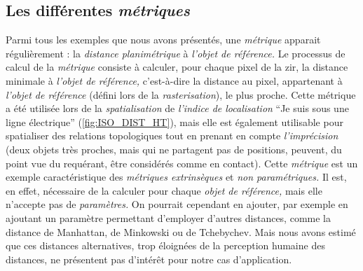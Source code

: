 \subsection{Les différentes \emph{métriques}}

Parmi tous les exemples que nous avons présentés, une \emph{métrique}
apparait régulièrement : la \emph{distance planimétrique} à
\emph{l'objet de référence.} Le processus de calcul de la
\emph{métrique} consiste à calculer, pour chaque pixel de la \ac{zir},
la distance minimale à \emph{l'objet de référence,} c'est-à-dire la
distance au pixel, appartenant à \emph{l'objet de référence} (défini
lors de la \emph{rasterisation}), le plus proche. Cette métrique a été
utilisée lors de la \emph{spatialisation} de \emph{l'indice de
  localisation} \enquote{Je suis sous une ligne électrique}
(\autoref{fig:ISO_DIST_HT}), mais elle est également utilisable pour
spatialiser des relations topologiques tout en prenant en compte
\emph{l'imprécision} (\eg deux objets très proches, mais qui ne
partagent pas de positions, peuvent, du point vue du requérant, être
considérés comme en contact). Cette \emph{métrique} est un exemple
caractéristique des \emph{métriques extrinsèques} et \emph{non
  paramétriques.} Il est, en effet, nécessaire de la calculer pour
chaque \emph{objet de référence,} mais elle n'accepte pas de
\emph{paramètres.}  On pourrait cependant en ajouter, par exemple en
ajoutant un paramètre permettant d'employer d'autres distances, comme
la distance de Manhattan, de Minkowski ou de Tchebychev. Mais nous
avons estimé que ces distances alternatives, trop éloignées de la
perception humaine des distances, ne présentent pas d’intérêt pour
notre cas d'application.

